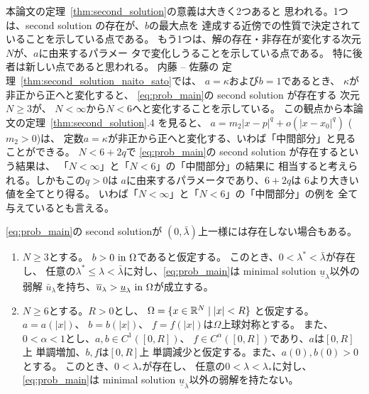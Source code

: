 本論文の定理~\ref{thm:second_solution}の意義は大きく2つあると
思われる。1つは、second solution の存在が、$b$の最大点を
達成する近傍での性質で決定されていることを示している点である。
もう1つは、解の存在・非存在が変化する次元$N$が、$a$に由来するパラメー
タで変化しうることを示している点である。
特に後者は新しい点であると思われる。
内藤 -- 佐藤の
定理~\ref{thm:second_solution_naito_sato}では、
$a = \kappa$および$b = 1$であるとき、
$\kappa$が非正から正へと変化すると、
\ref{eq:prob_main}の second solution が存在する
次元$N \geq 3$が、
$N < \infty$から$N < 6$へと変化することを示している。
この観点から本論文の定理~\ref{thm:second_solution}.4 を見ると、
$a = m_2 \lvert x - p \rvert^{q} + o(\lvert x-x_0
\rvert^{q})$ ($m_2 > 0$)は、
定数$a = \kappa$が非正から正へと変化する、いわば「中間部分」と見ることができる。
$N < 6 + 2q$で
\ref{eq:prob_main}の second solution が存在するという結果は、
「$N < \infty$」と「$N < 6$」の「中間部分」の結果に
相当すると考えられる。しかもこの$q > 0$は
$a$に由来するパラメータであり、$6 + 2q$は
$6$より大きい値を全てとり得る。
いわば「$N < \infty$」と「$N < 6$」の「中間部分」の例を
全て与えているとも言える。

\ref{eq:prob_main}の second solutionが
$(0, \bar{\lambda})$上一様には存在しない場合もある。

\begin{thm} \label{thm:second_solution_nonex}
 \begin{enumerate}[1.]  \sage
  \item $N \geq 3$とする。
        $b > 0 ~\text{in}~ \Omega$であると仮定する。
        このとき、$0 < \lambda^* < \bar{\lambda}$が存在し、
        任意の$\lambda^* \leq
        \lambda < \bar{\lambda}$に対し、\ref{eq:prob_main}は
        minimal solution $\underline{u}_\lambda$以外の弱解
        $\bar{u}_\lambda$を持ち、$\overline{u}_\lambda >
        \underline{u}_\lambda ~\text{in}~ \Omega$が成立する。
  \item $N \geq 6$とする。$R > 0$とし、
        $\Omega = \{ x \in \mathbb{R}^N \mid \lvert x \rvert < R\}$
        と仮定する。
        $a = a(\lvert x \rvert)$、
        $b = b(\lvert x \rvert)$、
        $f = f(\lvert x \rvert)$は$\Omega$上球対称とする。
        また、$0 < \alpha < 1$とし、$a , b \in C^1([0, R])$、
        $f \in C^\alpha([0, R])$であり、$a$は$[0, R]$上
        単調増加、$b, f$は$[0, R]$上
        単調減少と仮定する。また、$a(0), b(0) > 0$とする。
        このとき、$0 < \lambda_*$が存在し、
        任意の$0 < \lambda < \lambda_*$に対し、
        \ref{eq:prob_main}は
        minimal solution $\underline{u}_\lambda$以外の弱解を持たない。
 \end{enumerate}
\end{thm}


